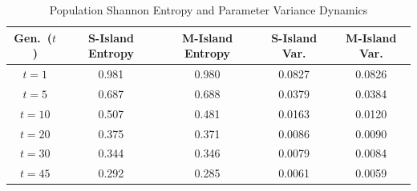 \begin{table}[t]
\centering
\caption{Population Shannon Entropy and Parameter Variance Dynamics}
\label{tab:population_diversity}
\small
\begin{tabular}{ccccc}
\hline
\textbf{Gen.\ ($t$)} &
\textbf{S-Island Entropy} &
\textbf{M-Island Entropy} &
\textbf{S-Island Var.} &
\textbf{M-Island Var.} \\
\hline
$t = 1$  & 0.981 & 0.980 & 0.0827 & 0.0826 \\
$t = 5$  & 0.687 & 0.688 & 0.0379 & 0.0384 \\
$t = 10$ & 0.507 & 0.481 & 0.0163 & 0.0120 \\
$t = 20$ & 0.375 & 0.371 & 0.0086 & 0.0090 \\
$t = 30$ & 0.344 & 0.346 & 0.0079 & 0.0084 \\
$t = 45$ & 0.292 & 0.285 & 0.0061 & 0.0059 \\
\hline
\end{tabular}
\normalsize
\end{table}
